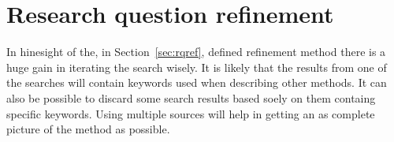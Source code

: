 \section*{Research question refinement}
\label{sec:rqref}

In hinesight of the, in Section~\ref{sec:rqref}, defined refinement method
there is a huge gain in iterating the search wisely. It is likely that the
results from one of the searches will contain keywords used when describing
other methods. It can also be possible to discard some search results based
soely on them containg specific keywords. Using multiple sources will help in
getting an as complete picture of the method as possible.


